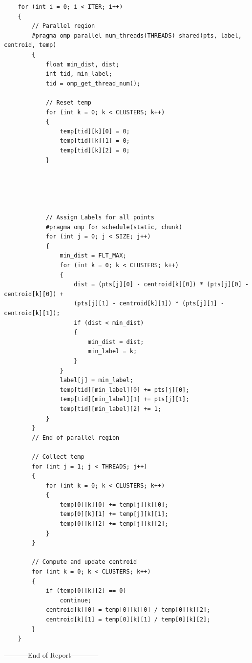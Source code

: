 \documentclass[11pt,a4paper,oneside]{article}
\begin{document}
    \begin{Verbatim}
    for (int i = 0; i < ITER; i++)
    {	
    	// Parallel region
    	#pragma omp parallel num_threads(THREADS) shared(pts, label, centroid, temp)
    	{	
    		float min_dist, dist;
		    int tid, min_label;
		    tid = omp_get_thread_num();
    
		    // Reset temp
		    for (int k = 0; k < CLUSTERS; k++)
		    {
			    temp[tid][k][0] = 0;
			    temp[tid][k][1] = 0;
			    temp[tid][k][2] = 0;
		    }
		    
		    
		    
		    
    
		    // Assign Labels for all points
		    #pragma omp for schedule(static, chunk)
		    for (int j = 0; j < SIZE; j++)
		    {
			    min_dist = FLT_MAX;                
			    for (int k = 0; k < CLUSTERS; k++)
			    {
				    dist = (pts[j][0] - centroid[k][0]) * (pts[j][0] - centroid[k][0]) +
				    (pts[j][1] - centroid[k][1]) * (pts[j][1] - centroid[k][1]);
				    if (dist < min_dist)
				    {
					    min_dist = dist;
					    min_label = k;
			    	}
		    	}
			    label[j] = min_label;
			    temp[tid][min_label][0] += pts[j][0];
			    temp[tid][min_label][1] += pts[j][1];
			    temp[tid][min_label][2] += 1; 
    		}
    	}
	    // End of parallel region
	    
	    // Collect temp
	    for (int j = 1; j < THREADS; j++)
	    {
		    for (int k = 0; k < CLUSTERS; k++)
		    {
			    temp[0][k][0] += temp[j][k][0];
			    temp[0][k][1] += temp[j][k][1];
			    temp[0][k][2] += temp[j][k][2];
		    }
	    }
    
	    // Compute and update centroid
	    for (int k = 0; k < CLUSTERS; k++)
	    {
		    if (temp[0][k][2] == 0)
		    	continue;
		    centroid[k][0] = temp[0][k][0] / temp[0][k][2];
		    centroid[k][1] = temp[0][k][1] / temp[0][k][2];
	    }
    }
    \end{Verbatim}
    
    \begin{center}
    	-----------End of Report------------
    \end{center}
    
\end{document}
